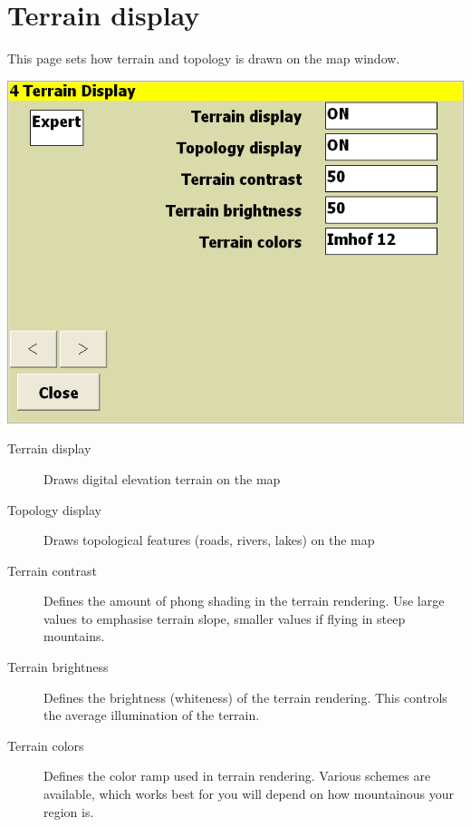 \documentclass[a4paper,12pt]{refrep}
\begin{document}
\clearpage
\section{Terrain display}\label{sec:terrain-display}

This page sets how terrain and topology is drawn on the map window.

\begin{center}
\includegraphics[angle=0,width=\linewidth,keepaspectratio='true']{figures/config-t.png}
\end{center}

\begin{description}
\item[Terrain display] Draws digital elevation terrain on the map
\item[Topology display] Draws topological features (roads, rivers, lakes) on the map
\item[Terrain contrast]  Defines the amount of phong shading in the terrain rendering.  Use large values to emphasise terrain slope, smaller values if flying in steep mountains.
\item[Terrain brightness]  Defines the brightness (whiteness) of the terrain rendering.  This controls the average illumination of the terrain.
\item[Terrain colors]  Defines the color ramp used in terrain rendering.  Various schemes are available, which works best for you will depend on how mountainous your region is.
\end{description}
\end{document}
